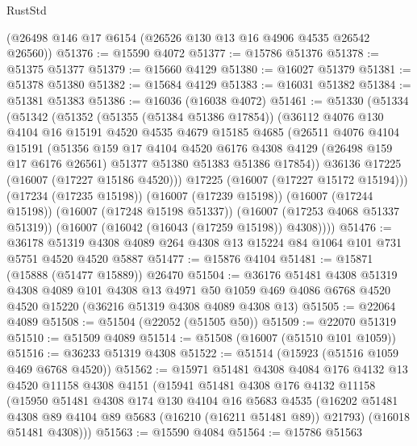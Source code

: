 \begin{lexlean}{RustStd}
\begin{coremodule}
    (@26498 @146 @17 @6154 (@26526 @130 @13 @16 @4906 @4535 @26542 @26560))
@51376 := @15590 @4072
@51377 := @15786 @51376
@51378 := @51375 @51377
@51379 := @15660 @4129
@51380 := @16027 @51379
@51381 := @51378 @51380
@51382 := @15684 @4129
@51383 := @16031 @51382
@51384 := @51381 @51383
@51386 := @16036 (@16038 @4072)
@51461 := @51330
    (@51334
      (@51342
        (@51352
          (@51355 (@51384 @51386 @17854))
          (@36112
            @4076
            @130
            @4104
            @16
            @15191
            @4520
            @4535
            @4679
            @15185
            @4685
            (@26511
              @4076
              @4104
              @15191
              (@51356
                @159
                @17
                @4104
                @4520
                @6176
                @4308
                @4129
                (@26498 @159 @17 @6176 @26561)
                @51377
                @51380
                @51383
                @51386
                @17854))
            @36136
            @17225
            (@16007 (@17227 @15186 @4520)))
          @17225
          (@16007 (@17227 @15172 @15194)))
        (@17234 (@17235 @15198))
        (@16007 (@17239 @15198))
        (@16007 (@17244 @15198))
        (@16007 (@17248 @15198 @51337))
        (@16007 (@17253 @4068 @51337 @51319))
        (@16007 (@16042 (@16043 (@17259 @15198)) @4308))))
@51476 := @36178
    @51319
    @4308
    @4089
    @264
    @4308
    @13
    @15224
    @84
    @1064
    @101
    @731
    @5751
    @4520
    @4520
    @5887
@51477 := @15876 @4104
@51481 := @15871 (@15888 (@51477 @15889)) @26470
@51504 := @36176
    @51481
    @4308
    @51319
    @4308
    @4089
    @101
    @4308
    @13
    @4971
    @50
    @1059
    @469
    @4086
    @6768
    @4520
    @4520
    @15220
    (@36216 @51319 @4308 @4089 @4308 @13)
@51505 := @22064 @4089
@51508 := @51504 (@22052 (@51505 @50))
@51509 := @22070 @51319
@51510 := @51509 @4089
@51514 := @51508 (@16007 (@51510 @101 @1059))
@51516 := @36233 @51319 @4308
@51522 := @51514 (@15923 (@51516 @1059 @469 @6768 @4520))
@51562 := @15971
    @51481
    @4308
    @4084
    @176
    @4132
    @13
    @4520
    @11158
    @4308
    @4151
    (@15941
      @51481
      @4308
      @176
      @4132
      @11158
      (@15950
        @51481
        @4308
        @174
        @130
        @4104
        @16
        @5683
        @4535
        (@16202 @51481 @4308 @89 @4104 @89 @5683 (@16210 (@16211 @51481 @89)) @21793)
        (@16018 @51481 @4308)))
@51563 := @15590 @4084
@51564 := @15786 @51563

\end{coremodule}
\end{lexlean}
